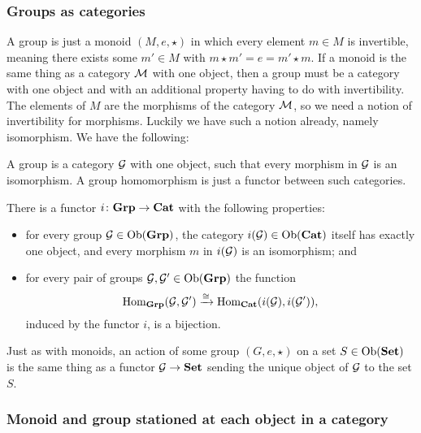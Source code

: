 
\subsubsection{Groups as categories}

A group is just a monoid $(M,e,\star)$ in which every element $m\in M$ is invertible, meaning there exists some $m'\in M$ with $m\star m'=e=m'\star m.$ If a monoid is the same thing as a category $\mathcal{M}$ with one object, then a group must be a category with one object and with an additional property having to do with invertibility. The elements of $M$ are the morphisms of the category $\mathcal{M}$, so we need a notion of invertibility for morphisms. Luckily we have such a notion already, namely isomorphism. We have the following:
\begin{slogan}
A group is a category $\mathcal{G}$ with one object, such that every morphism in $\mathcal{G}$ is an isomorphism. A group homomorphism is just a functor between such categories.
\end{slogan}

\begin{theorem}\label{thm:grp to cat}

There is a functor $i\colon{\bf Grp}\rightarrow{\bf Cat}$ with the following properties:
\begin{itemize}
\item for every group $\mathcal{G}\in\textnormal{Ob}({\bf Grp})$, the category $i(\mathcal{G})\in\textnormal{Ob}({\bf Cat})$ itself has exactly one object, and every morphism $m$ in $i(\mathcal{G})$ is an isomorphism; and 
\item for every pair of groups $\mathcal{G},\mathcal{G}'\in\textnormal{Ob}({\bf Grp})$ the function $$\textnormal{Hom}_{\bf Grp}(\mathcal{G},\mathcal{G}')\xrightarrow{\cong}\textnormal{Hom}_{\bf Cat}(i(\mathcal{G}),i(\mathcal{G}')),$$ induced by the functor $i$, is a bijection.
\end{itemize}

\end{theorem}

Just as with monoids, an action of some group $(G,e,\star)$ on a set $S\in\textnormal{Ob}({\bf Set})$ is the same thing as a functor $\mathcal{G}\rightarrow{\bf Set}$ sending the unique object of $\mathcal{G}$ to the set $S$. 


\subsubsection{Monoid and group stationed at each object in a category}

